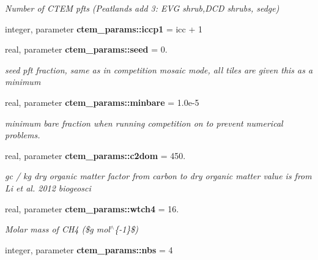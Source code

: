 \begin{DoxyCompactItemize}
\begin{DoxyCompactList}\small\item\em Number of C\+T\+E\+M pfts (Peatlands add 3\+: E\+V\+G shrub,D\+C\+D shrubs, sedge) \end{DoxyCompactList}\item 
\hypertarget{namespacectem__params_a1da4b2c80e21cf1adf10e9c7ee9a2189}{}integer, parameter {\bfseries ctem\+\_\+params\+::iccp1} = icc + 1\label{namespacectem__params_a1da4b2c80e21cf1adf10e9c7ee9a2189}

\item 
\hypertarget{namespacectem__params_ac9f4780ce317911fbf6daa45a90a8dad}{}real, parameter {\bfseries ctem\+\_\+params\+::seed} = 0.\label{namespacectem__params_ac9f4780ce317911fbf6daa45a90a8dad}

\begin{DoxyCompactList}\small\item\em seed pft fraction, same as in competition  mosaic mode, all tiles are given this as a minimum \end{DoxyCompactList}\item 
\hypertarget{namespacectem__params_a4e93696e56f999aa1005c61d4ed25789}{}real, parameter {\bfseries ctem\+\_\+params\+::minbare} = 1.\+0e-\/5\label{namespacectem__params_a4e93696e56f999aa1005c61d4ed25789}

\begin{DoxyCompactList}\small\item\em minimum bare fraction when running competition on to prevent numerical problems. \end{DoxyCompactList}\item 
\hypertarget{namespacectem__params_a6acddc90acef172ea5a361fd7e628696}{}real, parameter {\bfseries ctem\+\_\+params\+::c2dom} = 450.\label{namespacectem__params_a6acddc90acef172ea5a361fd7e628696}

\begin{DoxyCompactList}\small\item\em gc / kg dry organic matter  factor from carbon to dry organic matter value is from Li et al. 2012 biogeosci \end{DoxyCompactList}\item 
\hypertarget{namespacectem__params_a5246c472162b5b9f071d4e55d87ee84c}{}real, parameter {\bfseries ctem\+\_\+params\+::wtch4} = 16.\label{namespacectem__params_a5246c472162b5b9f071d4e55d87ee84c}

\begin{DoxyCompactList}\small\item\em Molar mass of C\+H4 (\$g mol$^\wedge$\{-\/1\}\$) \end{DoxyCompactList}\item 
\hypertarget{namespacectem__params_a1e8ba7b501ad6afcb7260b6b4711ae86}{}integer, parameter {\bfseries ctem\+\_\+params\+::nbs} = 4\label{namespacectem__params_a1e8ba7b501ad6afcb7260b6b4711ae86}


\end{DoxyCompactItemize}
